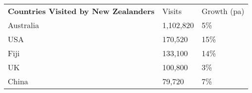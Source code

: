 \begin{tabular}[t]{p{4.8cm}>{\hfill}p{1.3cm}>{\hfill}p{1.4cm}}
 \textbf{Countries Visited by New Zealanders} & Visits & Growth (pa) \\ 
 Australia & 1,102,820 & 5\% \\ 
  USA &   170,520 & 15\% \\ 
  Fiji &   133,100 & 14\% \\ 
  UK &   100,800 & 3\% \\ 
  China &    79,720 & 7\% \\ 
  \end{tabular}
